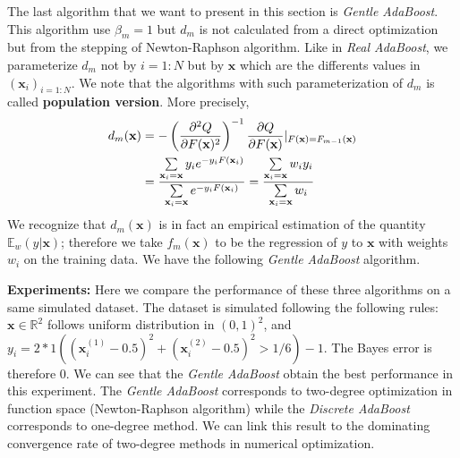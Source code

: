 \documentclass[a4paper,twoside,12pt]{article}
\begin{document}
The last algorithm that we want to present in this section is \textsl{Gentle AdaBoost}. This algorithm use $\beta_m = 1$ but $d_m$ is not calculated from a direct optimization but from the stepping of Newton-Raphson algorithm. Like in \textsl{Real AdaBoost}, we parameterize $d_m$ not by $i=1:N$ but by $\textbf{x}$ which are the differents values in $(\textbf{x}_i)_{i=1:N}$. We note that the algorithms with such parameterization of $d_m$ is called \textbf{population version}. More precisely,
\begin{align}
    d_m(\textbf{x}) &= -\left( \dfrac{\partial^2 Q}{\partial F(\textbf{x})^2}\right)^{-1}\dfrac{\partial Q}{\partial F(\textbf{x})} \vert_{F(\textbf{x}) = F_{m-1}(\textbf{x})} \notag \\
    &= \dfrac{\sum\limits_{\textbf{x}_i = \textbf{x}} y_ie^{-y_iF(\textbf{x}_i)}}{\sum\limits_{\textbf{x}_i = \textbf{x}} e^{-y_iF(\textbf{x}_i)}} = \dfrac{\sum\limits_{\textbf{x}_i = \textbf{x}} w_iy_i}{\sum\limits_{\textbf{x}_i = \textbf{x}} w_i} \notag
\end{align}
We recognize that $d_m(\textbf{x})$ is in fact an empirical estimation of the quantity $\mathbb{E}_w(y\vert \textbf{x})$; therefore we take $f_m(\textbf{x})$ to be the regression of $y$ to $\textbf{x}$ with weights $w_i$ on the training data. We have the following \textsl{Gentle AdaBoost} algorithm.

\begin{center}
\end{center}

\textbf{Experiments:} Here we compare the performance of these three algorithms on a same simulated dataset. The dataset is simulated following the following rules: $\textbf{x} \in \mathbb{R}^2$ follows uniform distribution in $(0, 1)^2$, and $y_i = 2*1((\textbf{x}_i^{(1)} - 0.5)^2 + (\textbf{x}_i^{(2)} - 0.5)^2 > 1/6) - 1$. The Bayes error is therefore $0$. We can see that the \textsl{Gentle AdaBoost} obtain the best performance in this experiment. The \textsl{Gentle AdaBoost} corresponds to two-degree optimization in function space (Newton-Raphson algorithm) while the \textsl{Discrete AdaBoost} corresponds to one-degree method. We can link this result to the dominating convergence rate of two-degree methods in numerical optimization.
\end{document}

